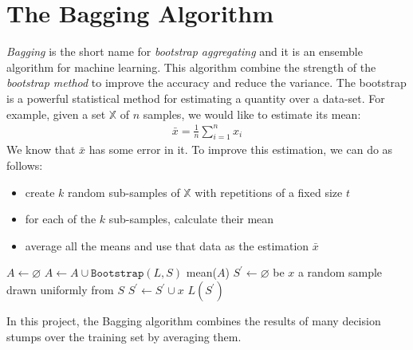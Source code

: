 
\chapter{The Bagging Algorithm}

\textit{Bagging} is the short name for \textit{bootstrap aggregating} and it is an ensemble algorithm for machine learning. This algorithm combine the strength of the \textit{bootstrap method} to improve the accuracy and reduce the variance. The bootstrap is a powerful statistical method for estimating a quantity over a data-set. For example, given a set $\mathbb{X}$ of $n$ samples, we would like to estimate its mean:
\begin{align*}
	\bar{x} = \frac{1}{n}\sum_{i=1}^{n}x_{i}
\end{align*}
We know that $\bar{x}$ has some error in it. To improve this estimation, we can do as follows:
\begin{itemize}
	\item create $k$ random sub-samples of $\mathbb{X}$ with repetitions of a fixed size $t$
	\item for each of the $k$ sub-samples, calculate their mean
	\item average all the means and use that data as the estimation $\bar{x}$
\end{itemize}
\begin{algorithm}[htpb]
	\caption{}
	\label{alg:bagging}
	\begin{algorithmic}[1]
		\State $A \gets \varnothing$
		\State $A \gets A \cup \texttt{Bootstrap}(L,S)$
		\EndFor
		\Return mean($A$)
		\EndProcedure
		\State $S^{\prime} \gets \varnothing$
		\State be $x$ a random sample drawn uniformly from $S$
		\State $S^{\prime} \gets S^{\prime} \cup x$
		\EndFor
		\Return $L(S^{\prime})$
		\EndProcedure
	\end{algorithmic}
\end{algorithm}
In this project, the Bagging algorithm combines the results of many decision stumps over the training set by averaging them.
